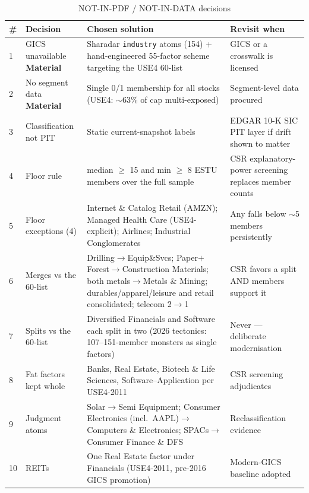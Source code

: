 \documentclass[11pt,a4paper]{article}
\newcommand{\WARN}[1]{\textcolor{warn}{\textbf{#1}}}
\begin{document}
\begin{longtable}{@{}p{0.5cm}p{3.6cm}p{6.0cm}p{3.8cm}@{}}
\caption{NOT-IN-PDF / NOT-IN-DATA decisions}\\
\toprule
\textbf{\#} & \textbf{Decision} & \textbf{Chosen solution} & \textbf{Revisit when} \\
\midrule
\endhead
1 & GICS unavailable \WARN{Material} & Sharadar \texttt{industry} atoms (154) + hand-engineered 55-factor scheme targeting the USE4 60-list & GICS or a crosswalk is licensed \\[3pt]
2 & No segment data \WARN{Material} & Single 0/1 membership for all stocks (USE4: $\sim$63\% of cap multi-exposed) & Segment-level data procured \\[3pt]
3 & Classification not PIT & Static current-snapshot labels & EDGAR 10-K SIC PIT layer if drift shown to matter \\[3pt]
4 & Floor rule & median $\geq$ 15 and min $\geq$ 8 ESTU members over the full sample & CSR explanatory-power screening replaces member counts \\[3pt]
5 & Floor exceptions (4) & Internet \& Catalog Retail (AMZN); Managed Health Care (USE4-explicit); Airlines; Industrial Conglomerates & Any falls below $\sim$5 members persistently \\[3pt]
6 & Merges vs the 60-list & Drilling$\to$Equip\&Svcs; Paper$+$Forest$\to$Construction Materials; both metals$\to$Metals \& Mining; durables/apparel/leisure and retail consolidated; telecom 2$\to$1 & CSR favors a split AND members support it \\[3pt]
7 & Splits vs the 60-list & Diversified Financials and Software each split in two (2026 tectonics: 107--151-member monsters as single factors) & Never --- deliberate modernisation \\[3pt]
8 & Fat factors kept whole & Banks, Real Estate, Biotech \& Life Sciences, Software--Application per USE4-2011 & CSR screening adjudicates \\[3pt]
9 & Judgment atoms & Solar$\to$Semi Equipment; Consumer Electronics (incl.\ AAPL)$\to$Computers \& Electronics; SPACs$\to$Consumer Finance \& DFS & Reclassification evidence \\[3pt]
10 & REITs & One Real Estate factor under Financials (USE4-2011, pre-2016 GICS promotion) & Modern-GICS baseline adopted \\
\bottomrule
\end{longtable}

\end{document}
